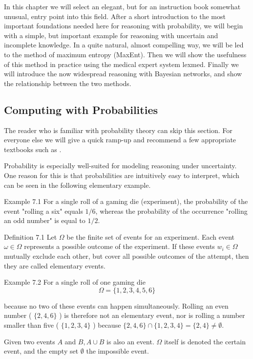 \documentclass[10pt]{book}
\begin{document}
In this chapter we will select an elegant, but for an instruction book somewhat unusual, entry point into this field. After a short introduction to the most important foundations needed here for reasoning with probability, we will begin with a simple, but important example for reasoning with uncertain and incomplete knowledge. In a quite natural, almost compelling way, we will be led to the method of maximum entropy (MaxEnt). Then we will show the usefulness of this method in practice using the medical expert system lexmed. Finally we will introduce the now widespread reasoning with Bayesian networks, and show the relationship between the two methods.

\subsection{Computing with Probabilities}
The reader who is familiar with probability theory can skip this section. For everyone else we will give a quick ramp-up and recommend a few appropriate textbooks such as \cite{ros09,fpp07}.

Probability is especially well-suited for modeling reasoning under uncertainty. One reason for this is that probabilities are intuitively easy to interpret, which can be seen in the following elementary example.

Example 7.1 For a single roll of a gaming die (experiment), the probability of the event "rolling a six" equals $1 / 6$, whereas the probability of the occurrence "rolling an odd number" is equal to $1 / 2$.

Definition 7.1 Let $\Omega$ be the finite set of events for an experiment. Each event $\omega \in \Omega$ represents a possible outcome of the experiment. If these events $w_{i} \in \Omega$ mutually exclude each other, but cover all possible outcomes of the attempt, then they are called elementary events.

Example 7.2 For a single roll of one gaming die
$$
\Omega=\{1,2,3,4,5,6\}
$$

because no two of these events can happen simultaneously. Rolling an even number ( $\{2,4,6\}$ ) is therefore not an elementary event, nor is rolling a number smaller than five ( $\{1,2,3,4\}$ ) because $\{2,4,6\} \cap\{1,2,3,4\}=\{2,4\} \neq \emptyset$.

Given two events $A$ and $B, A \cup B$ is also an event. $\Omega$ itself is denoted the certain event, and the empty set $\emptyset$ the impossible event.
\end{document}
